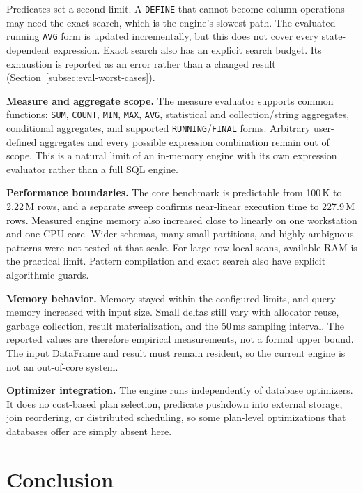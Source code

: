 Predicates set a second limit.  A \texttt{DEFINE} that cannot become
column operations may need the exact search, which is the engine's
slowest path.  The evaluated running \texttt{AVG} form is updated
incrementally, but this does not cover every state-dependent
expression.  Exact search also has an explicit search budget.  Its
exhaustion is reported as an error rather than a changed result
(Section~\ref{subsec:eval-worst-cases}).

\textbf{Measure and aggregate scope.}
The measure evaluator supports common functions: \texttt{SUM},
\texttt{COUNT}, \texttt{MIN}, \texttt{MAX}, \texttt{AVG}, statistical
and collection/string aggregates, conditional aggregates, and supported
\texttt{RUNNING}/\texttt{FINAL} forms.  Arbitrary user-defined
aggregates and every possible expression combination remain out of
scope.  This is a natural limit of an in-memory engine with its own
expression evaluator rather than a full SQL engine.

\textbf{Performance boundaries.}
The core benchmark is predictable from 100\,K to 2.22\,M rows, and a
separate sweep confirms near-linear execution time to 227.9\,M rows.
Measured engine memory also increased close to linearly
on one workstation and one CPU core.  Wider schemas, many small
partitions, and highly ambiguous patterns were not tested at that
scale.  For large row-local scans, available RAM is the practical
limit.  Pattern compilation and exact search also have explicit
algorithmic guards.

\textbf{Memory behavior.}
Memory stayed within the configured limits, and query memory increased
with input size.  Small deltas still vary with allocator reuse, garbage
collection, result materialization, and the 50\,ms sampling interval.
The reported values are therefore empirical measurements, not a formal
upper bound.  The input DataFrame and result must remain resident, so
the current engine is not an out-of-core system.

\textbf{Optimizer integration.}
The engine runs independently of database optimizers.  It does no
cost-based plan selection, predicate pushdown into external storage,
join reordering, or distributed scheduling, so some plan-level
optimizations that databases offer are simply absent here.

\section{Conclusion}
\label{sec:conclusion}

